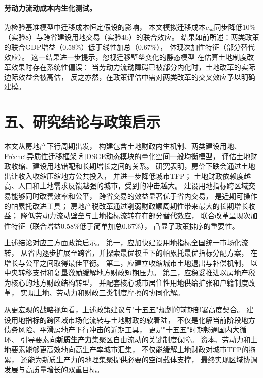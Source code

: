 \documentclass[UTF8,a4paper,12pt]{ctexart}
\theoremstyle{plain}
\theoremstyle{definition}
\theoremstyle{remark}
\begin{document}
\paragraph{劳动力流动成本内生化测试。}
为检验基准模型中迁移成本恒定假设的影响，
本文模拟迁移成本$c_{od}$同步降低10\%（实验8）与跨省建设用地交易（实验4b）的联合效应。
结果如前所述：两类政策的联合GDP增益（0.58\%）低于线性加总（0.67\%），
体现次加性特征（部分替代效应）。
这一结果进一步提示，忽视迁移壁垒变化的静态模型
在估算土地制度改革效果时存在系统性偏误：
当劳动力流动障碍已被部分内化时，土地改革的实际边际效益会被高估，
反之亦然，在政策评估中需对两类改革的交叉效应予以明确建模。

\section{五、研究结论与政策启示}

本文从房地产下行周期出发，
构建包含土地财政内生机制、两类建设用地、Fréchet异质性迁移框架
和DSGE动态模块的量化空间一般均衡模型，
评估土地财政收缩、建设用地错配和长期增长之间的关系。
研究表明，房价下跌会通过土地出让收入收缩压缩地方公共投入，
并进一步降低城市TFP；
土地财政依赖度越高、人口和土地需求反馈越强的城市，受到的冲击越大。
建设用地指标跨区域交易能够同时改善效率和公平，
跨省交易的效益显著优于省内交易，
是近期可操作的帕累托改进工具；
房地产税改革通过削弱财政顺周期性带来最大的长期增长收益；
降低劳动力流动壁垒与土地指标流转存在部分替代效应，
联合改革呈现次加性特征（联合增益0.58\%低于简单加总0.67\%），
凸显了政策排序的重要性。

上述结论对应三方面政策启示。
第一，应加快建设用地指标全国统一市场化流转，
从省内逐步扩展至跨省，并探索最优权重下的帕累托最优指标分配方案，
在增长与公平之间取得最佳平衡。
第二，应建立收缩城市土地退出与补偿机制，
以中央转移支付和复垦激励缓解地方财政短期压力。
第三，应稳妥推进以房地产税为核心的地方财政结构转型，
并配套核心城市居住性用地供给扩张和户籍制度改革，
实现土地、劳动力和财政三类制度摩擦的协同化解。

从更宏观的战略视角看，上述政策建议与"十五五"规划的前期部署高度契合。
建设用地指标的跨区域市场化流转与土地财政的软着陆，
不仅是化解当前阶段地方债务风险、平滑房地产下行冲击的近期工具，
更是"十五五"时期畅通国内大循环、
引导要素向\textbf{新质生产力}集聚区自由流动的关键制度保障。
资本、劳动力和土地要素能够更高效地向高生产率城市汇集，
不仅能缓解土地财政对城市TFP的拖累，
还能为新质生产力的地理集聚提供必要的空间载体支撑，
最终实现区域协调发展与高质量增长的双重目标。
\end{document}

